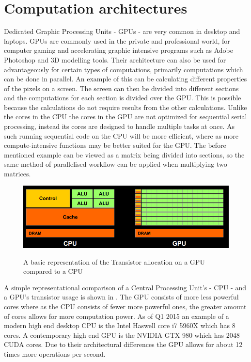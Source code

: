 \section{Computation architectures}
\label{sec:GPU}
Dedicated Graphic Processing Units - GPUs - are very common in desktop and laptops. \citep{STEAMHW}
GPUs are commonly used in the private and professional world, for computer gaming and accelerating graphic intensive programs such as Adobe Photoshop and 3D modelling tools. \citep{NVIDIAADOBE}
Their architecture can also be used for advantageously for certain types of computations, primarily computations which can be done in parallel. 
An example of this can be calculating different properties of the pixels on a screen. 
The screen can then be divided into different sections and the computations for each section is divided over the GPU.
This is possible because the calculations do not require results from the other calculations.
Unlike the cores in the CPU the cores in the GPU are not optimized for sequential serial processing, instead its cores are designed to handle multiple tasks at once. 
As such running sequential code on the CPU will be more efficient, where as more compute-intensive functions may be better suited for the GPU.\citep{NvidiaGPGPU}
The before mentioned example can be viewed as a matrix being divided into sections, so the same method of parallelised workflow can be applied when multiplying two matrices.

\begin{figure}[h!]
\centering
 \includegraphics[width=1\textwidth]{figures/GPUCPUimage.png} %
\caption{A basic representation of the Transistor allocation on a GPU compared to a CPU}\label{image:GPUCPUimage}\citep{NvidiaCUDASeminar}
\vspace{-15pt}
\end{figure}

A simple representational comparison of a Central Processing Unit's - CPU - and a GPU's transistor usage is shown in .
The GPU consists of more less powerful cores where as the CPU consists of fewer more powerful ones, the greater amount of cores allows for more computation power.
As of Q1 2015 an example of a modern high end desktop CPU is the Intel Haswell core i7 5960X which has 8 cores. \citep{puget}
A contemporary high end GPU is the NVIDIA GTX 980 which has 2048 CUDA cores. \citep{techpowerup,gtx980}
Due to their architectural differences the GPU allows for about 12 times more operations per second.

